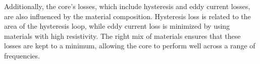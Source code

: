 Additionally, the core's losses, which include hysteresis and eddy current losses, are also influenced by the material composition. Hysteresis loss is related to the area of the hysteresis loop, while eddy current loss is minimized by using materials with high resistivity. The right mix of materials ensures that these losses are kept to a minimum, allowing the core to perform well across a range of frequencies.

